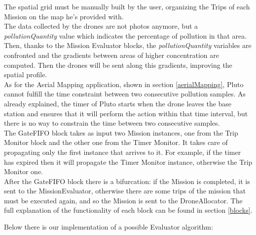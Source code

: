 The spatial grid must be manually built by the user, organizing the Trips of each Mission on the map he's provided with.
\\

The data collected by the drones are not photos anymore, but a \textit{pollutionQuantity} value which indicates the percentage of pollution in that area.
\\

Then, thanks to the Mission Evaluator blocks, the \textit{pollutionQuantity} variables are confronted and the gradients between areas of higher concentration are computed.
Then the drones will be sent along this gradients, improving the spatial profile.
\\

As for the Aerial Mapping application, shown in section \ref{aerialMapping}, Pluto cannot fulfill the time constraint between two consecutive pollution samples.
As already explained, the timer of Pluto starts when the drone leaves the base station and ensures that it will perform the action within that time interval, but there is no way to constrain the time between two consecutive samples.
\\

The GateFIFO block takes as input two Mission instances, one from the Trip Monitor block and the other one from the Timer Monitor.
It takes care of propagating only the first instance that arrives to it.
For example, if the timer has expired then it will propagate the Timer Monitor instance, otherwise the Trip Monitor one.
\\

After the GateFIFO block there is a bifurcation:
if the Mission is completed, it is sent to the MissionEvaluator, otherwise there are some trips of the mission that must be executed again, and so the Mission is sent to the DroneAllocator.
The full explanation of the functionality of each block can be found in section \ref{blocks}.


Below there is our implementation of a possible Evaluator algorithm:
\\

